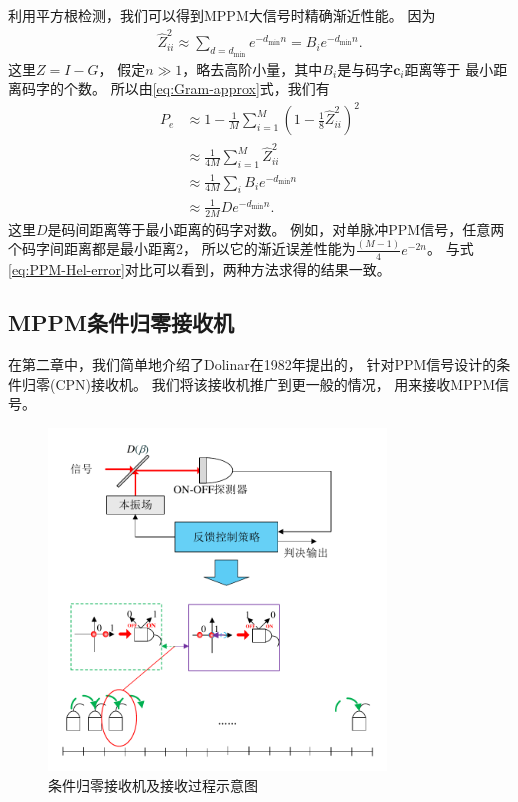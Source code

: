 利用平方根检测，我们可以得到MPPM大信号时精确渐近性能。
因为
\begin{equation}
\begin{split}
\hat{Z}^2_{ii} \approx \sum_{d=d_{\min}} e^{-d_{\min} n} = B_i e^{- d_{\min} n}.
\end{split}
\end{equation}
这里$Z = I -G$，
假定$n \gg 1$，略去高阶小量，其中$B_i$是与码字$\bm{c}_i$距离等于
最小距离码字的个数。
所以由\ref{eq:Gram-approx}式，我们有
\begin{equation}
\begin{split}
P_e &\approx 1 - \frac{1}{M} \sum_{i=1}^M (1 - \frac{1}{8} \hat{Z}^2_{ii})^2 \\
    &\approx \frac{1}{4M} \sum_{i=1}^M \hat{Z}^2_{ii} \\
    &\approx \frac{1}{4M} \sum_i B_i e^{-d_{\min} n} \\
    &\approx \frac{1}{2M} D e^{-d_{\min} n}.
\end{split}
\end{equation}
这里$D$是码间距离等于最小距离的码字对数。
例如，对单脉冲PPM信号，任意两个码字间距离都是最小距离2，
所以它的渐近误差性能为$\frac{(M-1)}{4} e^{-2 n}$。
与式\ref{eq:PPM-Hel-error}对比可以看到，两种方法求得的结果一致。



\subsection{MPPM条件归零接收机}
在第二章中，我们简单地介绍了Dolinar在1982年提出的，
针对PPM信号设计的条件归零(CPN)接收机。
我们将该接收机推广到更一般的情况，
用来接收MPPM信号。


\begin{figure}
\centering
  \includegraphics[width=0.8\textwidth]{figures/chap4/CPN}
  \caption{条件归零接收机及接收过程示意图}
  \label{fig:CPN}
\end{figure}

